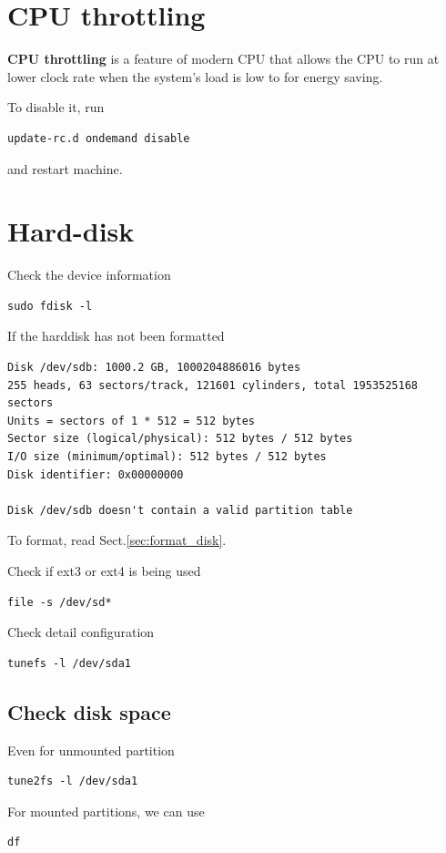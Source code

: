 \section{CPU throttling}
\label{sec:CPU_throttling}

{\bf CPU throttling} is a feature of modern CPU that allows the CPU to run at
lower clock rate when the system's load is low to for energy saving. 

To disable it, run
\begin{verbatim}
update-rc.d ondemand disable
\end{verbatim}
and restart machine.


\section{Hard-disk}

Check the device information
\begin{verbatim}
sudo fdisk -l
\end{verbatim}

If the harddisk has not been formatted
\begin{verbatim}
Disk /dev/sdb: 1000.2 GB, 1000204886016 bytes
255 heads, 63 sectors/track, 121601 cylinders, total 1953525168 sectors
Units = sectors of 1 * 512 = 512 bytes
Sector size (logical/physical): 512 bytes / 512 bytes
I/O size (minimum/optimal): 512 bytes / 512 bytes
Disk identifier: 0x00000000

Disk /dev/sdb doesn't contain a valid partition table
\end{verbatim}
To format, read Sect.\ref{sec:format_disk}.

Check if ext3 or ext4 is being used
\begin{verbatim}
file -s /dev/sd*
\end{verbatim}

Check detail configuration 
\begin{verbatim}
tunefs -l /dev/sda1
\end{verbatim}

\subsection{Check disk space}

Even for unmounted partition
\begin{verbatim}
tune2fs -l /dev/sda1
\end{verbatim}

For mounted partitions, we can use 
\begin{verbatim}
df 
\end{verbatim}


